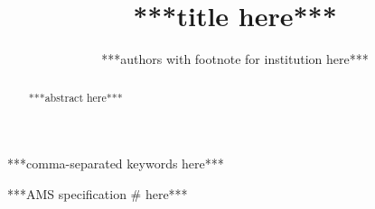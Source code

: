 \documentclass[final,leqno,onefignum,onetabnum]{siamltex1213}
\title{***title here***}
\author{***authors with footnote for institution here***} %
\begin{document}
\maketitle

\renewcommand{\thefootnote}{\fnsymbol{footnote}}
\renewcommand{\thefootnote}{\arabic{footnote}}


\begin{abstract}
    ***abstract here***
\end{abstract}

\begin{keywords}
    ***comma-separated keywords here***
\end{keywords}

\begin{AMS}
    ***AMS specification \# here***
\end{AMS}


% 
\end{document}

